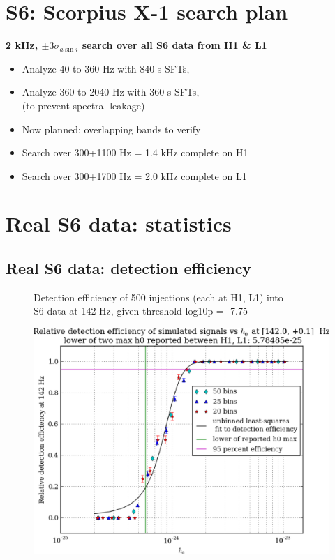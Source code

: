 \section{S6: Scorpius X-1 search plan}

\textbf{2 kHz, $\pm 3 \sigma_{a \sin i}$ search over all S6 data from H1 \& L1}
\begin{itemize}
\item Analyze 40 to 360 Hz with 840 s SFTs,
\item Analyze 360 to 2040 Hz with 360 s SFTs,\\
(to prevent spectral leakage)
\item Now planned: overlapping bands to verify
\item Search over 300+1100 Hz = 1.4 kHz complete on H1
\item Search over 300+1700 Hz = 2.0 kHz complete on L1
\end{itemize}

\section{Real S6 data: statistics}
\subsection{Real S6 data: detection efficiency}

\begin{figure}
\caption{\protect\includegraphics[width=0.4\paperwidth,height=0.2\paperheight]{plots/detectionEfficiencyh0-142-0Hz.eps}}
Detection efficiency of 500 injections (each at H1, L1) into\\
S6 data at 142 Hz, given threshold log10p = -7.75
\end{figure}

